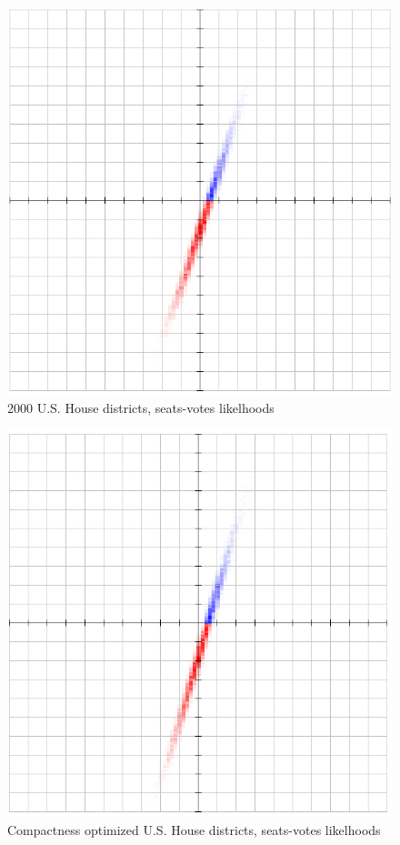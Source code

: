 \documentclass[preprint,12pt]{article}
\begin{document}
\begin{figure}[htb!]
    \begin{center}
        \includegraphics[scale=0.5]{Figures/original_method/2000_ush.png}
        \caption{2000 U.S. House districts, seats-votes likelhoods}\label{fig:2000_ush}
    \end{center}
\end{figure}
\begin{figure}[htb!]
    \begin{center}
        \includegraphics[scale=0.5]{Figures/original_method/BD__ush.png}
        \caption{Compactness optimized U.S. House districts, seats-votes likelhoods}\label{fig:BD_ush}
    \end{center}
\end{figure}
\end{document}
